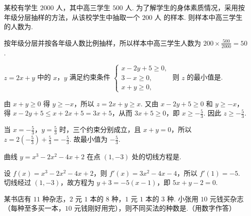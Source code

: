 \begin{problem}
某校有学生 \(2000\text{ 人}\)，其中高三学生 \(500\text{ 人}\). 为了解学生的身体素质情况，采用按年级分层抽样的方法，从该校学生中抽取一个 \(200\text{ 人}\) 的样本. 则样本中高三学生的人数为\fillinblank{}.
\end{problem}

\begin{solution}
按年级分层并按各年级人数比例抽样，所以样本中高三学生人数为 \(200\times\frac{500}{2000}=50\).
\end{solution}

\begin{problem}
\(z = 2x + y\) 中的 \(x\)，\(y\) 满足约束条件 \(\begin{cases}
x - 2y + 5 \geqslant 0,\\
3 - x \geqslant 0,\\
x + y \geqslant 0,
\end{cases}\) 则 \(z\) 的最小值是\fillinblank{}.
\end{problem}

\begin{solution}
由 \(x+y\geqslant0\) 得 \(y\geqslant-x\)，所以 \(z=2x+y\geqslant x\). 又由 \(x-2y+5\geqslant0\) 和 \(y\geqslant-x\)，得 \(x-2y+5\leqslant x+2x+5=3x+5\)，从而 \(3x+5\geqslant0\)，即 \(x\geqslant-\frac{5}{3}\). 因此 \(z\geqslant-\frac{5}{3}\).

当 \(x=-\frac{5}{3}\)，\(y=\frac{5}{3}\) 时，三个约束分别成立，且 \(x+y=0\)，所以 \(z=2\left(-\frac{5}{3}\right)+\frac{5}{3}=-\frac{5}{3}\). 故最小值为 \(-\frac{5}{3}\).
\end{solution}

\begin{problem}
曲线 \( y = x^3 - 2x^2 - 4x + 2 \) 在点 \(\left(1,-3\right)\) 处的切线方程是\fillinblank{}.
\end{problem}

\begin{solution}
设 \(f(x)=x^3-2x^2-4x+2\)，则 \(f'(x)=3x^2-4x-4\)，所以 \(f'(1)=-5\). 切线经过 \((1,-3)\)，故方程为 \(y+3=-5(x-1)\)，即 \(5x+y-2=0\).
\end{solution}

\begin{problem}
某书店有 \(11\) 种杂志，\(2\text{ 元}\) \(1\text{ 本}\)的 \(8\) 种，\(1\text{ 元}\) \(1\text{ 本}\)的 \(3\) 种. 小张用 \(10\text{ 元}\)钱买杂志（每种至多买一本，\(10\text{ 元}\)钱刚好用完），则不同买法的种数是\fillinblank{}.（用数字作答）
\end{problem}

